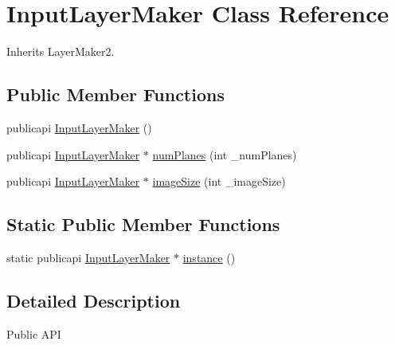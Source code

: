 \hypertarget{classInputLayerMaker}{\section{Input\-Layer\-Maker Class Reference}
\label{classInputLayerMaker}
}


Inherits Layer\-Maker2.

\subsection*{Public Member Functions}
\begin{DoxyCompactItemize}
\item 
publicapi \hyperlink{classInputLayerMaker_ab07f09c59b8f3b376c473310f25a5f5a}{Input\-Layer\-Maker} ()
\item 
publicapi \hyperlink{classInputLayerMaker}{Input\-Layer\-Maker} $\ast$ \hyperlink{classInputLayerMaker_a4bcf4ddea0f4b3bf9061a5f1866ced42}{num\-Planes} (int \-\_\-num\-Planes)
\item 
publicapi \hyperlink{classInputLayerMaker}{Input\-Layer\-Maker} $\ast$ \hyperlink{classInputLayerMaker_a0be24032966f868c1bcd86291ad141ba}{image\-Size} (int \-\_\-image\-Size)
\end{DoxyCompactItemize}
\subsection*{Static Public Member Functions}
\begin{DoxyCompactItemize}
\item 
static publicapi \hyperlink{classInputLayerMaker}{Input\-Layer\-Maker} $\ast$ \hyperlink{classInputLayerMaker_a5f929cc46beba91c7ffe8c50ba812531}{instance} ()
\end{DoxyCompactItemize}


\subsection{Detailed Description}
\begin{DoxyParagraph}{Public A\-P\-I}

\end{DoxyParagraph}


